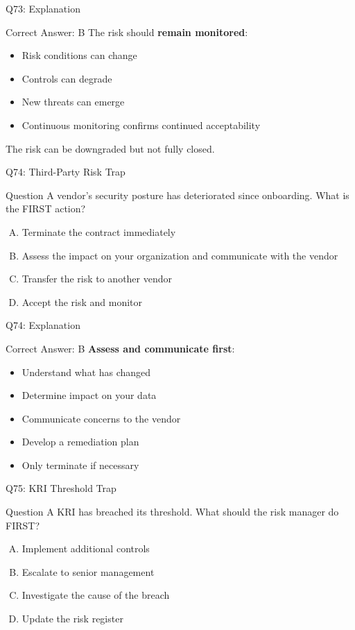 \documentclass{beamer}
\begin{document}
	\begin{frame}{Q73: Explanation}
		\begin{block}{Correct Answer: B}
			The risk should \textbf{remain monitored}:
			\begin{itemize}
				\item Risk conditions can change
				\item Controls can degrade
				\item New threats can emerge
				\item Continuous monitoring confirms continued acceptability
			\end{itemize}
			The risk can be downgraded but not fully closed.
		\end{block}
	\end{frame}
	
	\begin{frame}{Q74: Third-Party Risk Trap}
		\begin{block}{Question}
			A vendor's security posture has deteriorated since onboarding. What is the FIRST action?
		\end{block}
		\begin{enumerate}[(A)]
			\item Terminate the contract immediately
			\item Assess the impact on your organization and communicate with the vendor
			\item Transfer the risk to another vendor
			\item Accept the risk and monitor
		\end{enumerate}
	\end{frame}
	
	\begin{frame}{Q74: Explanation}
		\begin{block}{Correct Answer: B}
			\textbf{Assess and communicate first}:
			\begin{itemize}
				\item Understand what has changed
				\item Determine impact on your data
				\item Communicate concerns to the vendor
				\item Develop a remediation plan
				\item Only terminate if necessary
			\end{itemize}
		\end{block}
	\end{frame}
	
	\begin{frame}{Q75: KRI Threshold Trap}
		\begin{block}{Question}
			A KRI has breached its threshold. What should the risk manager do FIRST?
		\end{block}
		\begin{enumerate}[(A)]
			\item Implement additional controls
			\item Escalate to senior management
			\item Investigate the cause of the breach
			\item Update the risk register
		\end{enumerate}
	\end{frame}
	
\end{document}
